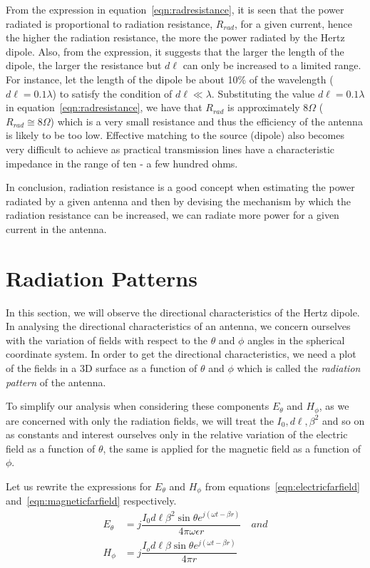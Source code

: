 From the expression in equation~\eqref{eqn:radresistance}, it is seen that the power radiated is proportional to radiation resistance, $R_{rad}$, for a given current, hence the higher the radiation resistance, the more the power radiated by the Hertz dipole. Also, from the expression, it suggests that the larger the length of the dipole, the larger the resistance but $d\ell$ can only be increased to a limited range. For instance, let the length of the dipole be about 10\%\; of the wavelength ($d\ell = 0.1\lambda$) to satisfy the condition of $d\ell \ll \lambda$. Substituting the value $d\ell = 0.1\lambda$ in equation~\eqref{eqn:radresistance}, we have that $R_{rad}$ is approximately $8\Omega$ ($R_{rad} \cong 8\Omega$) which is a very small resistance and thus the efficiency of the antenna is likely to be too low. Effective matching to the source (dipole) also becomes very difficult to achieve as practical transmission lines have a characteristic impedance in the range of ten - a few hundred ohms.

In conclusion, radiation resistance is a good concept when estimating the power radiated by a given antenna and then by devising the mechanism by which the radiation resistance can be increased, we can radiate more power for a given current in the antenna. 

\section{Radiation Patterns}
In this section, we will observe the directional characteristics of the Hertz dipole. In analysing the directional characteristics of an antenna, we concern ourselves with the variation of fields with respect to the $\theta$ and $\phi$ angles in the spherical coordinate system. In order to get the directional characteristics, we need a plot of the fields in a 3D surface as a function of $\theta$ and $\phi$ which is called the \emph{radiation pattern} of the antenna. 

To simplify our analysis when considering these components $E_\theta$ and $H_\phi$, as we are concerned with only the radiation fields, we will treat the $I_0, d\ell, \beta^2$ and so on as constants and interest ourselves only in the relative variation of the electric field as a function of $\theta$, the same is applied for the magnetic field as a function of $\phi$.

Let us rewrite the expressions for $E_\theta$ and $H_\phi$ from equations~\eqref{eqn:electricfarfield} and~\eqref{eqn:magneticfarfield} respectively.
\begin{align*}
E_\theta &= j\dfrac{I_0 d\ell\beta^2\sin\theta e^{j(\omega t - \beta r)}}{4\pi\omega\epsilon r} \quad and
\\
H_\phi &= j\dfrac{I_od\ell\beta\sin\theta e^{j(\omega t - \beta r)}}{4\pi r}
\end{align*}

